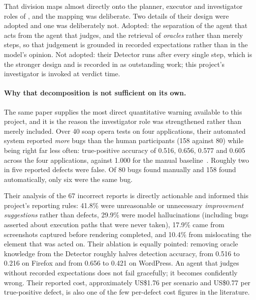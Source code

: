 That division maps almost directly onto the planner, executor and investigator
roles of , and the mapping was deliberate. Two details of their
design were adopted and one was deliberately not. Adopted: the separation of
the agent that acts from the agent that judges, and the retrieval of
\emph{oracles} rather than merely steps, so that judgement is grounded in
recorded expectations rather than in the model's opinion. Not adopted: their
Detector runs after every single step, which is the stronger design and is
recorded in  as outstanding work; this project's
investigator is invoked at verdict time.

\paragraph{Why that decomposition is not sufficient on its own.} The same paper
supplies the most direct quantitative warning available to this project, and it
is the reason the investigator role was strengthened rather than merely
included. Over 40 soap opera tests on four applications, their automated system
reported \emph{more} bugs than the human participants (158 against 80) while
being right far less often: true-positive accuracy of 0.516, 0.656, 0.577 and
0.605 across the four applications, against 1.000 for the manual
baseline~\cite{soapopera}. Roughly two in five reported defects were false. Of
80 bugs found manually and 158 found automatically, only six were the same
bug.

Their analysis of the 67 incorrect reports is directly actionable and informed
this project's reporting rules: 41.8\% were unreasonable or unnecessary
\emph{improvement suggestions} rather than defects, 29.9\% were model
hallucinations (including bugs asserted about execution paths that were never
taken), 17.9\% came from screenshots captured before rendering completed, and
10.4\% from mislocating the element that was acted on. Their ablation is
equally pointed: removing oracle knowledge from the Detector roughly halves
detection accuracy, from 0.516 to 0.216 on Firefox and from 0.656 to 0.421 on
WordPress. An agent that judges without recorded expectations does not fail
gracefully; it becomes confidently wrong. Their reported cost, approximately
US\$1.76 per scenario and US\$0.77 per true-positive defect, is also one of the
few per-defect cost figures in the literature.

